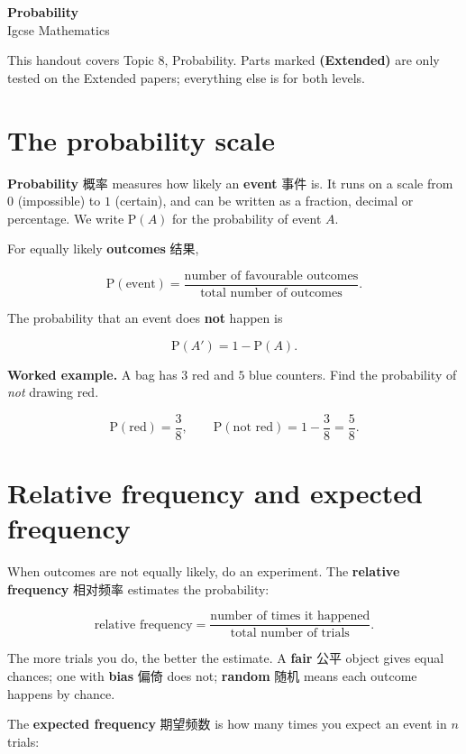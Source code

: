 \documentclass[11pt]{article}
\begin{document}
\begin{center}
  {\LARGE\bfseries Probability}\\[0.35em]
  {\large Igcse Mathematics}
\end{center}
\vspace{0.6em}

This handout covers Topic 8, Probability. Parts marked \textbf{(Extended)} are only tested on the Extended papers; everything else is for both levels.

\section*{The probability scale}

\textbf{Probability} 概率 measures how likely an \textbf{event} 事件 is. It runs on a scale from $0$ (impossible) to $1$ (certain), and can be written as a fraction, decimal or percentage. We write $\text{P}(A)$ for the probability of event $A$.

For equally likely \textbf{outcomes} 结果,

\[
\text{P}(\text{event}) = \frac{\text{number of favourable outcomes}}{\text{total number of outcomes}}.
\]

The probability that an event does \textbf{not} happen is

\[
\text{P}(A') = 1 - \text{P}(A).
\]

\textbf{Worked example.} A bag has $3$ red and $5$ blue counters. Find the probability of \emph{not} drawing red.

\[
\text{P}(\text{red}) = \frac{3}{8}, \qquad \text{P}(\text{not red}) = 1 - \frac{3}{8} = \frac{5}{8}.
\]

\section*{Relative frequency and expected frequency}

When outcomes are not equally likely, do an experiment. The \textbf{relative frequency} 相对频率 estimates the probability:

\[
\text{relative frequency} = \frac{\text{number of times it happened}}{\text{total number of trials}}.
\]

The more trials you do, the better the estimate. A \textbf{fair} 公平 object gives equal chances; one with \textbf{bias} 偏倚 does not; \textbf{random} 随机 means each outcome happens by chance.

The \textbf{expected frequency} 期望频数 is how many times you expect an event in $n$ trials:
\end{document}
